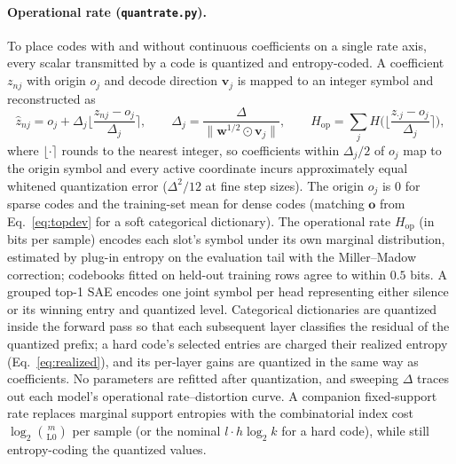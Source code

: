 \paragraph{Operational rate (\texttt{quantrate.py}).}
To place codes with and without continuous coefficients on a single rate
axis, every scalar transmitted by a code is quantized and entropy-coded. A
coefficient $z_{nj}$ with origin $o_j$ and decode direction $\mathbf{v}_j$
is mapped to an integer symbol and reconstructed as
\begin{equation}
	\hat z_{nj} = o_j + \Delta_j \Big\lfloor \frac{z_{nj} - o_j}{\Delta_j} \Big\rceil,
	\qquad
	\Delta_j = \frac{\Delta}{\lVert \mathbf{w}^{1/2} \odot \mathbf{v}_j \rVert},
	\qquad
	H_{\mathrm{op}} = \sum_j H\Big(\Big\lfloor \frac{z_{\cdot j} - o_j}{\Delta_j} \Big\rceil\Big),
	\label{eq:quantrate}
\end{equation}
where $\lfloor\cdot\rceil$ rounds to the nearest integer, so coefficients
within $\Delta_j/2$ of $o_j$ map to the origin symbol and every active
coordinate incurs approximately equal whitened quantization error
($\Delta^2/12$ at fine step sizes). The origin $o_j$ is $0$ for sparse
codes and the training-set mean for dense codes (matching $\mathbf{o}$ from
Eq.~\eqref{eq:topdev} for a soft categorical dictionary). The operational
rate $H_{\mathrm{op}}$ (in bits per sample) encodes each slot's symbol
under its own marginal distribution, estimated by plug-in entropy on the
evaluation tail with the Miller--Madow correction; codebooks fitted on held-out
training rows agree to within $0.5$ bits. A grouped top-1 SAE encodes one
joint symbol per head representing either silence or its winning entry and
quantized level. Categorical dictionaries are quantized inside the forward
pass so that each subsequent layer classifies the residual of the quantized
prefix; a hard code's selected entries are charged their realized entropy
(Eq.~\eqref{eq:realized}), and its per-layer gains are quantized in the
same way as coefficients. No parameters are refitted after quantization,
and sweeping $\Delta$ traces out each model's operational rate--distortion
curve. A companion fixed-support rate replaces marginal support entropies
with the combinatorial index cost $\log_2\binom{m}{\mathrm{L0}}$ per sample
(or the nominal $l\cdot h\log_2 k$ for a hard code), while still
entropy-coding the quantized values.


